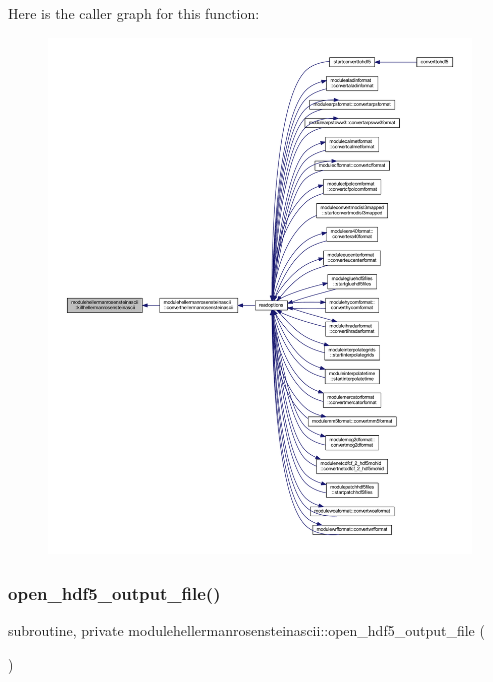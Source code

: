 Here is the caller graph for this function\+:\nopagebreak
\begin{figure}[H]
\begin{center}
\leavevmode
\includegraphics[width=350pt]{namespacemodulehellermanrosensteinascii_a2350c23791f119cd18bfa9a4e532508c_icgraph}
\end{center}
\end{figure}
\mbox{\label{namespacemodulehellermanrosensteinascii_a7fa8f1b341c583ddb13cecd1d05b9e77}} 
\subsubsection{\texorpdfstring{open\+\_\+hdf5\+\_\+output\+\_\+file()}{open\_hdf5\_output\_file()}}
{\footnotesize\ttfamily subroutine, private modulehellermanrosensteinascii\+::open\+\_\+hdf5\+\_\+output\+\_\+file (\begin{DoxyParamCaption}{ }\end{DoxyParamCaption})\hspace{0.3cm}{\ttfamily [private]}}

